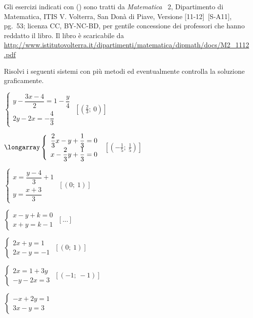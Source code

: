 Gli esercizi indicati con (\croce) sono tratti da \emph{Matematica }~2, 
Dipartimento di
Matematica, ITIS V. Volterra, San Donà di Piave, Versione [11-12]~[S-A11], 
pg.~53; licenza CC, BY-NC-BD, per gentile concessione dei
professori che hanno reddatto il libro. Il libro è scaricabile da 
\url{
http://www.istitutovolterra.it/dipartimenti/matematica/dipmath/docs/M2_1112.pdf}


\begin{esercizio}[\Ast]
 \label{ese:22.67}
 Risolvi i seguenti sistemi con più metodi ed eventualmente controlla
la soluzione graficamente.
\begin{multicols}{2}
\begin{enumeratea}
\item $\left\{\begin{array}{l}
y-\dfrac{3x-4}{2}=1-\dfrac{y}{4}\\
2y-2x=-{\dfrac{4}{3}}\end{array}\right.$
 \hfill $\left[\left(\frac{2}{3};~0\right)\right]$
\item $\longarray\left\{\begin{array}{l}
\dfrac{2}{3}x-y+\dfrac{1}{3}=0\\
x-\dfrac{2}{3}y+\dfrac{1}{3}=0\end{array}\right.$
 \hfill $\left[\left(-{\frac{1}{5}};~\frac{1}{5}\right)\right]$
\item $\left\{\begin{array}{l}
x=\dfrac{y-4}{3}+1\\
y=\dfrac{x+3}{3}\end{array}\right.$
 \hfill $\left[(0;~1)\right]$
\item $\left\{\begin{array}{l}
x-y+k=0\\
x+y=k-1\end{array}\right.$
 \hfill $\left[...\right]$
\item $\left\{\begin{array}{l}2x+y=1 \\2x-y=-1\end{array}\right.$
 \hfill $\left[(0;~1)\right]$
\item $\left\{\begin{array}{l}2x=1+3y\\-y-2x=3\end{array}\right.$
 \hfill $\left[(-1;~-1)\right]$
\item $\left\{\begin{array}{l}-x+2y=1 \\3x-y=3\end{array}\right.$

\end{enumeratea}
\end{multicols}
\end{esercizio}
